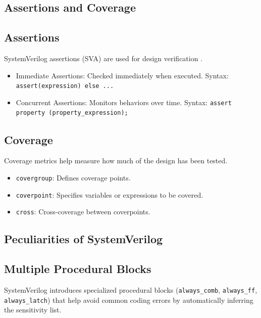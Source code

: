 \subsection{Assertions and Coverage}

\subsection{Assertions}
SystemVerilog assertions (SVA) are used for design verification \cite{foster2003assertions}.
\begin{itemize}
    \item Immediate Assertions: Checked immediately when executed.
        \newline Syntax: \texttt{assert(expression) else ...}
    \item Concurrent Assertions: Monitors behaviors over time.
        \newline Syntax: \texttt{assert property (property\_expression);}
\end{itemize}

\subsection{Coverage}
Coverage metrics help measure how much of the design has been tested.
\begin{itemize}
    \item \texttt{covergroup}: Defines coverage points.
    \item \texttt{coverpoint}: Specifies variables or expressions to be covered.
    \item \texttt{cross}: Cross-coverage between coverpoints.
\end{itemize}

\subsection{Peculiarities of SystemVerilog}

\subsection{Multiple Procedural Blocks}
SystemVerilog introduces specialized procedural blocks (\texttt{always\_comb}, \texttt{always\_ff}, \texttt{always\_latch}) that help avoid common coding errors by automatically inferring the sensitivity list.

